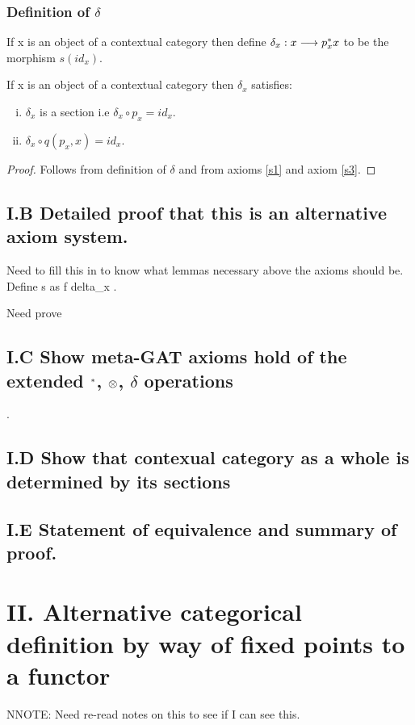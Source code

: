 \documentclass[10pt,a4paper]{scrartcl}
\begin{document}
\subsubsection {Definition of $\delta$}

If x is an object of a contextual category  then define $\delta_x: x \longrightarrow p_x ^* x$ to be
the morphism $s(id_x)$.

\begin{lemma}
\label {deltalemma}
If x is an object of a contextual category  then $\delta_x$ satisfies:
\begin{enumerate}[(i)]
\item $\delta_x$ is a section i.e $\delta_x \circ p_x = id_x$.
\item $\delta_x \circ q(p_x,x) = id_x$.
\end{enumerate}
\end{lemma}
\begin{proof}
Follows from definition of $\delta$ and from axioms \ref{s1} and axiom \ref{s3}.
\end{proof}

\subsection{I.B Detailed proof that this is an alternative axiom system.}
Need to fill this in to know what lemmas necessary above the axioms should be.
Define s as f \sub delta_x . 

Need prove 


\subsection{I.C Show meta-GAT axioms hold of the extended $^*$, $\otimes$, $\delta$
operations}.
\subsection {I.D Show that contexual category as a whole is determined by its sections}
\subsection{I.E Statement of equivalence and summary of proof.}

\section{II. Alternative categorical definition by way of fixed points to a functor}
NNOTE: Need re-read notes on this to see if I can see this.
\end{document}
